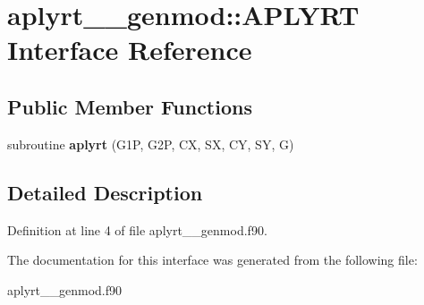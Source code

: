 \hypertarget{interfaceaplyrt____genmod_1_1_a_p_l_y_r_t}{\section{aplyrt\+\_\+\+\_\+genmod\+:\+:A\+P\+L\+Y\+R\+T Interface Reference}
\label{interfaceaplyrt____genmod_1_1_a_p_l_y_r_t}
}
\subsection*{Public Member Functions}
\begin{DoxyCompactItemize}
\item 
\hypertarget{interfaceaplyrt____genmod_1_1_a_p_l_y_r_t_a18a1a4c2f3894cf015527ab88ad08a3b}{subroutine {\bfseries aplyrt} (G1\+P, G2\+P, C\+X, S\+X, C\+Y, S\+Y, G)}\label{interfaceaplyrt____genmod_1_1_a_p_l_y_r_t_a18a1a4c2f3894cf015527ab88ad08a3b}

\end{DoxyCompactItemize}


\subsection{Detailed Description}


Definition at line 4 of file aplyrt\+\_\+\+\_\+genmod.\+f90.



The documentation for this interface was generated from the following file\+:\begin{DoxyCompactItemize}
\item 
aplyrt\+\_\+\+\_\+genmod.\+f90\end{DoxyCompactItemize}
